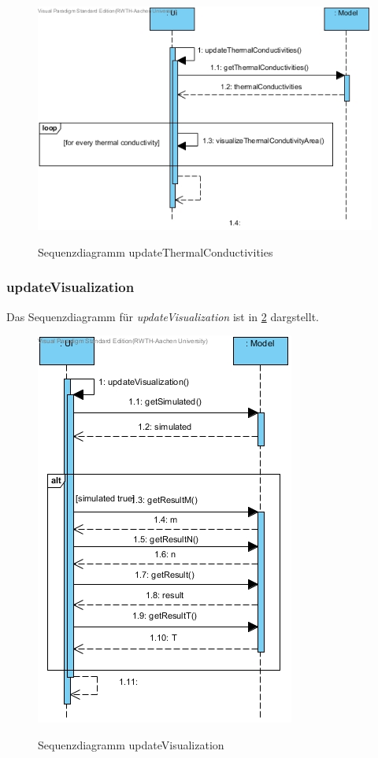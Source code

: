 \begin{figure}[H]
	\centering
	\includegraphics[scale=.6]{Bilder/Ui__updateThermalConductivities().jpg}\\
	\caption{Sequenzdiagramm updateThermalConductivities}
	\label{Sequenzdiagramm updateThermalConductivities}
\end{figure}

\subsubsection*{updateVisualization}

Das Sequenzdiagramm für \emph{updateVisualization} ist in \ref{Sequenzdiagramm updateVisualization} dargstellt.

\begin{figure}[H]
	\centering
	\includegraphics[scale=.6]{Bilder/Ui__updateVisualization().jpg}\\
	\caption{Sequenzdiagramm updateVisualization}
	\label{Sequenzdiagramm updateVisualization}
\end{figure}

